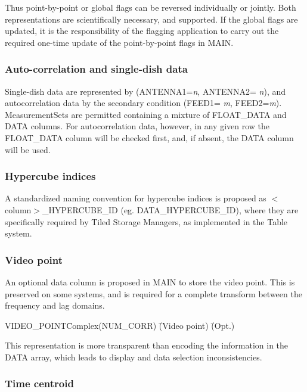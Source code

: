 \documentclass{article}
\begin{document}
 Thus point-by-point or global flags can be reversed individually or
jointly. Both representations are scientifically necessary, and
supported. If the global flags are updated, it is the responsibility
of the flagging application to carry out the required one-time update
of the point-by-point flags in MAIN.

\subsubsection{Auto-correlation and single-dish data}

Single-dish data are represented by (ANTENNA1={\it n}, ANTENNA2= {\it
n}), and autocorrelation data by the secondary condition (FEED1={\it
m}, FEED2={\it m}). MeasurementSets are permitted containing a mixture
of FLOAT\_DATA and DATA columns. For autocorrelation data, however, in
any given row the FLOAT\_DATA column will be checked first, and, if
absent, the DATA column will be used.

\subsubsection{Hypercube indices}

A standardized naming convention for hypercube indices is proposed as
$<$column$>$\_HYPERCUBE\_ID (eg. DATA\_HYPERCUBE\_ID), where they are
specifically required by Tiled Storage Managers, as implemented in the
Table system.

\subsubsection{Video point}

 An optional data column is proposed in MAIN to store the video
point. This is preserved on some systems, and is required for a
complete transform between the frequency and lag domains. 

\begin{tabbing} 
VIDEO\_POINT\quad\quad \= Complex(NUM\_CORR)\quad\quad 
\= (Video point) \quad\quad \= (Opt.) \\
\end{tabbing}

 This representation is more transparent than encoding the information
in the DATA array, which leads to display and data selection
inconsistencies.

\subsubsection{Time centroid}
\end{document}
